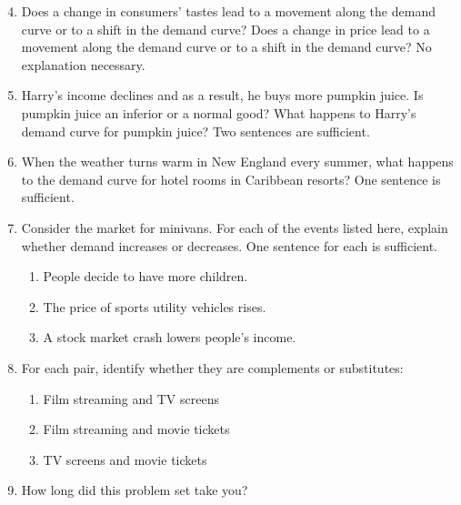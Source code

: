 \documentclass{article}
\begin{document}
\begin{enumerate}
\setcounter{enumi}{3}

\item Does a change in consumers' tastes lead to a movement along the demand curve or to a shift in the demand curve? Does a change in price lead to a movement along the demand curve or to a shift in the demand curve? No explanation necessary. 

\item Harry's income declines and as a result, he buys more pumpkin juice. Is pumpkin juice an inferior or a normal good? What happens to Harry's demand curve for pumpkin juice? Two sentences are sufficient.

\item When the weather turns warm in New England every summer, what happens to the demand curve for hotel rooms in Caribbean resorts? One sentence is sufficient.

\item Consider the market for minivans. For each of the events listed here, explain whether demand increases or decreases. One sentence for each is sufficient.

	\begin{enumerate}
	
	\item People decide to have more children.
	
	\item The price of sports utility vehicles rises.
	
	\item A stock market crash lowers people's income.
	
	\end{enumerate}
	
\item For each pair, identify whether they are complements or substitutes:

	\begin{enumerate}
	
	\item Film streaming and TV screens
	
	\item Film streaming and movie tickets
	
	\item TV screens and movie tickets
	
	\end{enumerate}
	
	
\item How long did this problem set take you?

\end{enumerate}
\end{document}
